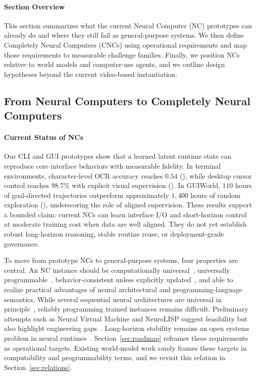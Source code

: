 \paragraph{Section Overview}
This section summarizes what the current Neural Computer (NC) prototypes can already do and where they still fail as general-purpose systems.
We then define Completely Neural Computers (CNCs) using operational requirements and map those requirements to measurable challenge families.
Finally, we position NCs relative to world models and computer-use agents, and we outline design hypotheses beyond the current video-based instantiation.

\subsection{From Neural Computers to Completely Neural Computers}

\paragraph{Current Status of NCs}
Our CLI and GUI prototypes show that a learned latent runtime state can reproduce core interface behaviors with measurable fidelity.
In terminal environments, character-level OCR accuracy reaches $0.54$ (), while desktop cursor control reaches $98.7\%$ with explicit visual supervision ().
In GUIWorld, $110$ hours of goal-directed trajectories outperform approximately $1{,}400$ hours of random exploration (), underscoring the role of aligned supervision.
These results support a bounded claim: current NCs can learn interface I/O and short-horizon control at moderate training cost when data are well aligned.
They do not yet establish robust long-horizon reasoning, stable routine reuse, or deployment-grade governance.

To move from prototype NCs to general-purpose systems, four properties are central.
An NC instance should be computationally universal~\citep{turing1936computable,siegelmann1992computational}, universally programmable~\citep{von1993first,wilkes1981best}, behavior-consistent unless explicitly updated~\citep{queloz2025explainability}, and able to realize practical advantages of neural architectural and programming-language semantics.
While several sequential neural architectures are universal in principle~\citep{siegelmann1992computational,perez2021attention}, reliably programming trained instances remains difficult.
Preliminary attempts such as Neural Virtual Machine and NeuroLISP suggest feasibility but also highlight engineering gaps~\citep{katz2019programmable,davis2022neurolisp}.
Long-horizon stability remains an open systems problem in neural runtimes~\citep{kirkpatrick2017overcoming,calanzonelogically}.
Section~\ref{sec:roadmap} reframes these requirements as operational targets.
Existing world-model work rarely frames these targets in computability and programmability terms, and we revisit this relation in Section~\ref{sec:relations}.

